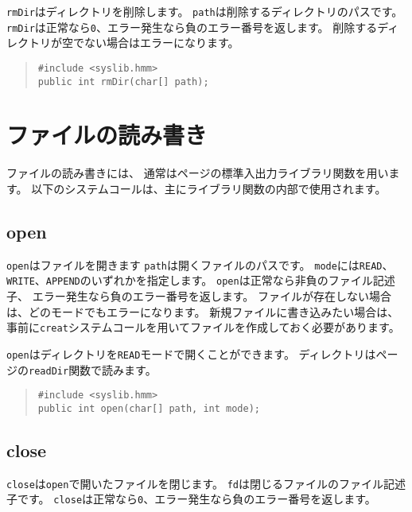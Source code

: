 \verb/rmDir/はディレクトリを削除します。
\verb/path/は削除するディレクトリのパスです。
\verb/rmDir/は正常なら\verb/0/、エラー発生なら負のエラー番号を返します。
削除するディレクトリが空でない場合はエラーになります。

\begin{quote}
\begin{verbatim}
#include <syslib.hmm>
public int rmDir(char[] path);
\end{verbatim}
\end{quote}

\section{ファイルの読み書き}

ファイルの読み書きには、
通常は\pageref{chap4:stdio}ページの標準入出力ライブラリ関数を用います。
以下のシステムコールは、主にライブラリ関数の内部で使用されます。

\subsection{open}

\verb/open/はファイルを開きます
\verb/path/は開くファイルのパスです。
\verb/mode/には\verb/READ/、\verb/WRITE/、\verb/APPEND/のいずれかを指定します。
\verb/open/は正常なら非負のファイル記述子、
エラー発生なら負のエラー番号を返します。
ファイルが存在しない場合は、どのモードでもエラーになります。
新規ファイルに書き込みたい場合は、
事前に\verb/creat/システムコールを用いてファイルを作成しておく必要があります。

\verb/open/はディレクトリを\verb/READ/モードで開くことができます。
ディレクトリは\pageref{chap4:readDir}ページの\verb/readDir/関数で読みます。

\begin{quote}
\begin{verbatim}
#include <syslib.hmm>
public int open(char[] path, int mode);
\end{verbatim}
\end{quote}

\subsection{close}

\verb/close/は\verb/open/で開いたファイルを閉じます。
\verb/fd/は閉じるファイルのファイル記述子です。
\verb/close/は正常なら\verb/0/、エラー発生なら負のエラー番号を返します。

